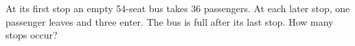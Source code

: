At its first stop an empty 54-seat bus takes 36 passengers. At each later stop, one passenger leaves and three enter. The bus is full after its last stop. How many stops occur?

